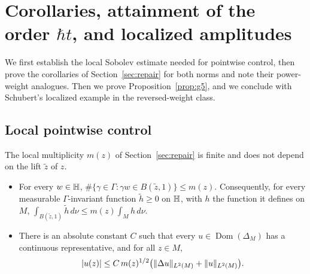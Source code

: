 \section{Corollaries, attainment of the order \texorpdfstring{$\hbar t$}{ht}, and localized amplitudes}\label{sec:consequences}
We first establish the local Sobolev estimate needed for pointwise control, then prove the corollaries of
Section~\ref{sec:repair} for both norms and note their power-weight analogues. Then we prove
Proposition~\ref{prop:g5}, and we conclude with Schubert's localized example in the reversed-weight class.

\subsection{Local pointwise control}\label{subsec:local-pointwise}
\begin{lemma}\label{pc:g43}
The local multiplicity $m(z)$ of Section~\ref{sec:repair} is finite and does not depend on the lift $\tilde z$ of $z$.
\begin{itemize}
\item[\textup{(a)}] For every $w\in\mathbb{H}$, $\#\{\gamma\in\Gamma:\gamma w\in B(\tilde z,1)\}\le m(z)$. Consequently, for every measurable
$\Gamma$-invariant function $\tilde h\ge0$ on $\mathbb{H}$, with $h$ the function it defines on $M$,
$\int_{B(\tilde z,1)}\tilde h\,d\nu\le m(z)\int_Mh\,d\nu$.
\item[\textup{(b)}] There is an absolute constant $C$ such that every $u\in\operatorname{Dom}(\Delta_M)$ has a continuous representative, and for
all $z\in M$,
\[
  |u(z)|\le C\,m(z)^{1/2}\big(\lVert \Delta u\rVert_{L^2(M)}+\lVert u\rVert_{L^2(M)}\big).
\]
\end{itemize}
\end{lemma}
